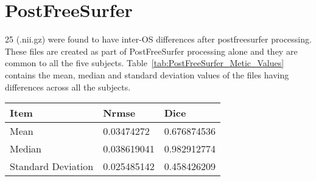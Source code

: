 \section{PostFreeSurfer}\label{sec:Postfreesurfer}
25 (.nii.gz) were found to have inter-OS differences after postfreesurfer processing. These files are created as part of PostFreeSurfer processing alone and they are common to all the five subjects. Table~\ref{tab:PostFreeSurfer_Metic_Values} contains the mean, median and standard deviation values of the files having differences across all the subjects.
\hfill \break
\begin{center}
\begin{tabular}{|l|l|l|}
\hline
\textbf{Item}      & \textbf{Nrmse} & \textbf{Dice} \\ \hline
Mean               & 0.03474272     & 0.676874536   \\ \hline
Median             & 0.038619041    & 0.982912774   \\ \hline
Standard Deviation & 0.025485142    & 0.458426209   \\ \hline
\end{tabular}
\label{tab:PostFreeSurfer_Metic_Values}
\end{center}
\hfill \break

